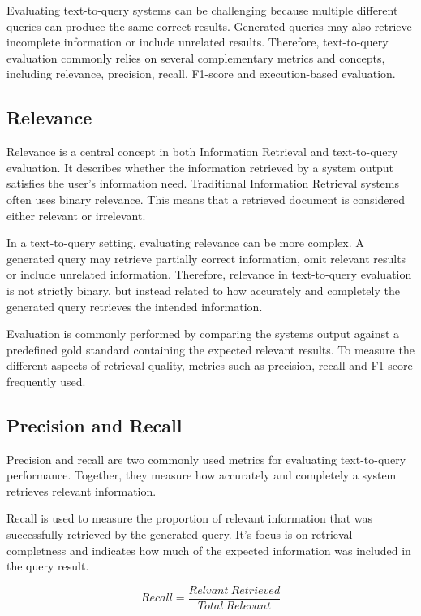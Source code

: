 Evaluating text-to-query systems can be challenging because multiple different queries can produce the same correct results. Generated queries may also retrieve incomplete information or include unrelated results. Therefore, text-to-query evaluation commonly relies on several complementary metrics and concepts, including relevance, precision, recall, F1-score and execution-based evaluation. 

\subsection{Relevance}

Relevance is a central concept in both Information Retrieval and text-to-query evaluation. It describes whether the information retrieved by a system output satisfies the user's information need. Traditional Information Retrieval systems often uses binary relevance. This means that a retrieved document is considered either relevant or irrelevant. 

In a text-to-query setting, evaluating relevance can be more complex. A generated query may retrieve partially correct information, omit relevant results or include unrelated information. Therefore, relevance in text-to-query evaluation is not strictly binary, but instead related to how accurately and completely the generated query retrieves the intended information.

Evaluation is commonly performed by comparing the systems output against a predefined gold standard containing the expected relevant results. To measure the different aspects of retrieval quality, metrics such as precision, recall and F1-score frequently used. 

    
\subsection{Precision and Recall}

Precision and recall are two commonly used metrics for evaluating text-to-query performance. Together, they measure how accurately and completely a system retrieves relevant information.

Recall is used to measure the proportion of relevant information that was successfully retrieved by the generated query. It's focus is on retrieval completness and indicates how much of the expected information was included in the query result. 

\[
Recall = \frac{Relvant\ Retrieved}{Total\ Relevant}
\]

